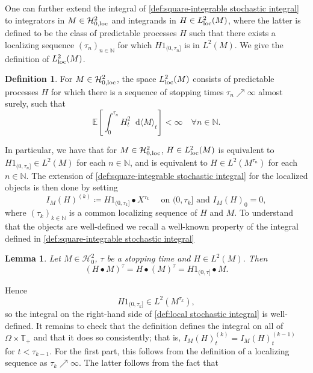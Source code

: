 \documentclass[11pt,a4paper,twoside,openany]{report}
\newcommand{\diff}{\mathop{}\!\mathrm{d}}
\theoremstyle{plain} %
\newtheorem{lemma}[lemma]{Lemma}
\theoremstyle{definition} %
\newtheorem{definition}[definition]{Definition}
\theoremstyle{remark} %
\begin{document}
One can further extend the integral of \cref{def:square-integrable stochastic integral} to integrators in \(M\in\mathcal{H}^2_{0,\rm{loc}}\) and integrands in \(H\in L^2_{\rm{loc}}(M)\), where the latter is defined to be the class of predictable processes \(H\) such that there exists a localizing sequence \((\tau_n)_{n\in\mathbb{N}}\) for which \(H1_{(0,\tau_n]}\) is in \(L^2(M)\). 
We give the definition of \(L_{\rm{loc}}^2(M)\).
\begin{definition}\label{def:L^p(M)_loc}
 For \(M\in\mathcal{H}^2_{0,\rm{loc}}\), the space \(L_{\rm{loc}}^2(M)\) consists of predictable processes \(H\) for which there is  a sequence of stopping times \(\tau_n\nearrow\infty\) almost surely, such that 
    \begin{equation}
        \mathbb{E}[\int_0^{\tau_n}H_t^2\diff \langle M\rangle_t]<\infty\quad\forall n\in\mathbb{N}.
    \end{equation}
\end{definition}
In particular, we have that for \(M\in\mathcal{H}_{0,\rm{loc}}^2\), \(H\in L^2_{\rm{loc}}(M)\) is equivalent to \(H1_{(0,\tau_n]}\in L^2(M)\) for each \(n\in\mathbb{N}\), and is equivalent to \(H\in L^2(M^{\tau_n})\) for each \(n\in\mathbb{N}\).
\bigbreak
The extension of \cref{def:square-integrable stochastic integral} for the localized objects is then done by setting 
\begin{equation}\label{def:local stochastic integral}
    I_M(H)^{(k)}\coloneqq H1_{(0,\tau_k]}\bullet X^{\tau_k}\quad \text{ on } (0,\tau_k] \text{ and } I_M(H)_0=0 ,
\end{equation}
where \((\tau_k)_{k\in\mathbb{N}}\) is a common localizing sequence of \(H\) and \(M\). To understand that the objects are well-defined we recall a well-known property of the integral defined in \cref{def:square-integrable stochastic integral}
\begin{lemma}\label{lemma:stopping stochastic integrals}
    Let \(M\in\mathcal{H}_0^2\), \(\tau\) be a stopping time and \(H\in L^2(M)\). Then
\begin{equation}
    (H\bullet M)^{\tau}=H\bullet(M)^{\tau}=H1_{(0,\tau]}\bullet M.
\end{equation}
\end{lemma}
Hence 
\begin{equation}
    H1_{(0,\tau_k]}\in L^2(M^{\tau_k}),
\end{equation} 
so the integral on the right-hand side of \cref{def:local stochastic integral} is well-defined. It remains to check that the definition defines the integral on all of \(\Omega\times\mathbb{T}_+\) and that it does so consistently; that is, \(I_M(H)^{(k)}_t=I_M(H)^{(k-1)}_t\) for \(t<\tau_{k-1}\). For the first part, this follows from the definition of a localizing sequence as \(\tau_k\nearrow\infty\). The latter follows from the fact that 
\end{document}
